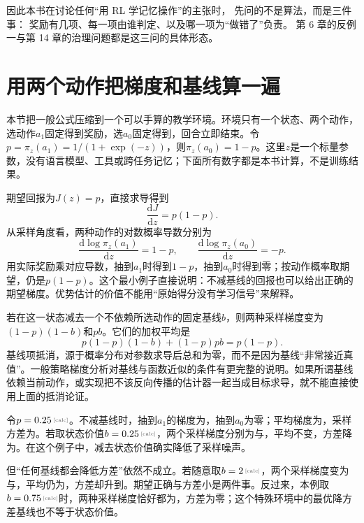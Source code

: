 因此本书在讨论任何``用 RL 学记忆操作''的主张时，
先问的不是算法，而是三件事：
奖励有几项、每一项由谁判定、以及哪一项为``做错了''负责。
第 6 章的反例一与第 14 章的治理问题都是这三问的具体形态。


\section{用两个动作把梯度和基线算一遍}
\label{sec:appc-two-action}

本节把一般公式压缩到一个可以手算的教学环境。环境只有一个状态、两个动作，选动作$a_1$固定得到奖励，选$a_0$固定得到，回合立即结束。令$p=\pi_z(a_1)=1/(1+\exp(-z))$，则$\pi_z(a_0)=1-p$。这里$z$是一个标量参数，没有语言模型、工具或跨任务记忆；下面所有数字都是本书计算，不是训练结果。

期望回报为$J(z)=p$，直接求导得到
\begin{equation}
 \frac{\mathrm dJ}{\mathrm dz}=p(1-p).
\end{equation}
从采样角度看，两种动作的对数概率导数分别为
\begin{equation}
 \frac{\mathrm d\log\pi_z(a_1)}{\mathrm dz}=1-p,
 \qquad
 \frac{\mathrm d\log\pi_z(a_0)}{\mathrm dz}=-p.
\end{equation}
用实际奖励乘对应导数，抽到$a_1$时得到$1-p$，抽到$a_0$时得到零；按动作概率取期望，仍是$p(1-p)$。这个最小例子直接说明：不减基线的回报也可以给出正确的期望梯度。优势估计的价值不能用“原始得分没有学习信号”来解释。

若在这一状态减去一个不依赖所选动作的固定基线$b$，则两种采样梯度变为$(1-p)(1-b)$和$pb$。它们的加权平均是
\begin{equation}
 p(1-p)(1-b)+(1-p)pb=p(1-p).
\end{equation}
基线项抵消，源于概率分布对参数求导后总和为零，而不是因为基线“非常接近真值”。一般策略梯度分析对基线与函数近似的条件有更完整的说明\cite{policy-gradient-1999}。如果所谓基线依赖当前动作，或实现把不该反向传播的估计器一起当成目标求导，就不能直接使用上面的抵消论证。

令$p=\calcnum{0.25}$。不减基线时，抽到$a_1$的梯度为，抽到$a_0$为零；平均梯度为，采样方差为。若取状态价值$b=\calcnum{0.25}$，两个采样梯度分别为与，平均不变，方差降为。在这个例子中，减去状态价值确实降低了采样噪声。

但“任何基线都会降低方差”依然不成立。若随意取$b=\calcnum{2}$，两个采样梯度变为与，平均仍为，方差却升到。期望正确与方差小是两件事。反过来，本例取$b=\calcnum{0.75}$时，两种采样梯度恰好都为，方差为零；这个特殊环境中的最优降方差基线也不等于状态价值。

